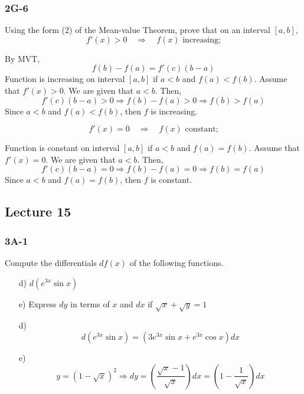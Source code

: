 \documentclass{article}
\begin{document}
\subsubsection{2G-6}
\begin{tcolorbox}
    Using the form (2) of the Mean-value Theorem, prove that on an interval $[a,b]$,
    \[  f'(x) > 0 \quad \Rightarrow \quad f(x) \text{ increasing;} \]
\end{tcolorbox}
By MVT,
\[ f(b) - f(a) = f'(c)(b-a) \]
Function is increasing on interval $[a,b]$ if $a < b$ and $f(a) < f(b)$. Assume that $f'(x) > 0$. We are given that $a < b$. Then,
\[ f'(c)(b-a) > 0 \Rightarrow f(b) - f(a) > 0 \Rightarrow f(b) > f(a) \]
Since $a < b$ and $f(a) < f(b)$, then $f$ is increasing. 
\begin{tcolorbox}
    \[  f'(x) = 0 \quad \Rightarrow \quad f(x) \text{ constant;} \]
\end{tcolorbox}
Function is constant on interval $[a,b]$ if $a < b$ and $f(a) = f(b)$. Assume that $f'(x) = 0$. We are given that $a < b$. Then,
\[ f'(c)(b-a) = 0 \Rightarrow f(b) - f(a) = 0 \Rightarrow f(b) = f(a) \]
Since $a < b$ and $f(a) = f(b)$, then $f$ is constant. 

\subsection{Lecture 15}

\subsubsection{3A-1}
\begin{tcolorbox}
    Compute the differentials $df(x)$ of the following functions.
    \begin{itemize}
        \item[d)] $d(e^{3x} \sin{x})$
        \item[e)] Express $dy$ in terms of $x$ and $dx$ if $\sqrt{x} + \sqrt{y} = 1$
    \end{itemize}
\end{tcolorbox}

\begin{itemize}
    \item[d)] 
    \[ d(e^{3x} \sin{x}) = (3e^{3x}\sin{x} + e^{3x}\cos{x})dx\]
    \item[e)]
    \[ y = (1 - \sqrt{x})^2 \Rightarrow dy = \left( \frac{\sqrt{x}-1}{\sqrt{x}} \right)dx = \left( 1 - \frac{1}{\sqrt{x}} \right) dx \]
\end{itemize}
\end{document}
